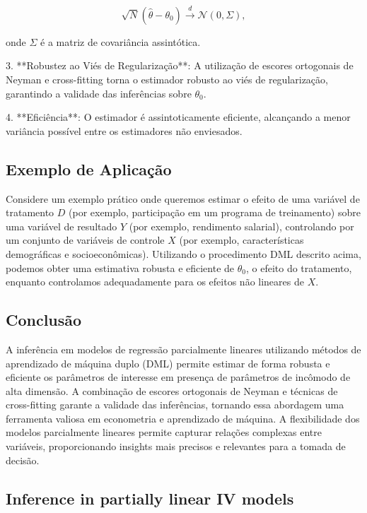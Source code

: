 \documentclass[a4paper,12pt]{article}[abntex2]
\begin{document}
\[
\sqrt{N}(\hat{\theta} - \theta_0) \xrightarrow{d} \mathcal{N}(0, \Sigma),
\]

onde $\Sigma$ é a matriz de covariância assintótica.

3. **Robustez ao Viés de Regularização**: A utilização de escores ortogonais de Neyman e cross-fitting torna o estimador robusto ao viés de regularização, garantindo a validade das inferências sobre $\theta_0$.

4. **Eficiência**: O estimador é assintoticamente eficiente, alcançando a menor variância possível entre os estimadores não enviesados.

\subsection*{Exemplo de Aplicação}

Considere um exemplo prático onde queremos estimar o efeito de uma variável de tratamento $D$ (por exemplo, participação em um programa de treinamento) sobre uma variável de resultado $Y$ (por exemplo, rendimento salarial), controlando por um conjunto de variáveis de controle $X$ (por exemplo, características demográficas e socioeconômicas). Utilizando o procedimento DML descrito acima, podemos obter uma estimativa robusta e eficiente de $\theta_0$, o efeito do tratamento, enquanto controlamos adequadamente para os efeitos não lineares de $X$.

\subsection*{Conclusão}

A inferência em modelos de regressão parcialmente lineares utilizando métodos de aprendizado de máquina duplo (DML) permite estimar de forma robusta e eficiente os parâmetros de interesse em presença de parâmetros de incômodo de alta dimensão. A combinação de escores ortogonais de Neyman e técnicas de cross-fitting garante a validade das inferências, tornando essa abordagem uma ferramenta valiosa em econometria e aprendizado de máquina. A flexibilidade dos modelos parcialmente lineares permite capturar relações complexas entre variáveis, proporcionando insights mais precisos e relevantes para a tomada de decisão.

\subsection{Inference in partially linear IV models}
\end{document}
